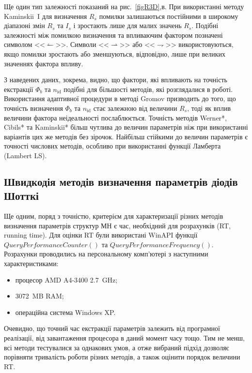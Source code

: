Ще один тип залежності показаний на рис.~\ref{figR3D},в.
При використанні методу Kaminskii~I для визначення  $R_s$ помилки залишаються постійними в широкому діапазоні змін $R_s$ та $I_s$ і зростають лише для малих значень $R_s$.
Подібні залежності між помилкою визначення та впливаючим фактором позначені символом <<$\leftharpoonup$>>.
Символи <<$\rightharpoonup$>> або <<$\rightharpoondown$>> використовуються, якщо помилки зростають або зменшуються, відповідно, лише при великих значеннях фактора впливу.

З наведених даних, зокрема, видно, що фактори, які впливають на точність екстракції $\Phi_b$ та  $n_\mathrm{id}$ подібні для більшості методів, які розглядалися в роботі.
Використання адаптивної процедури в методі Gromov призводить до того, що точність визначення $\Phi_b$ та  $n_\mathrm{id}$ стає залежною від величини $R_s$, тоді як вплив величини фактора неідеальності послаблюється.
Точність методів Werner*, Cibils* та Kaminskii* більш чутлива до величин параметрів ніж при використанні варіантів цих же методів без зірочок.
Найбільш стійкими до величин параметрів є точності числових методів, особливо при використанні функції Ламберта (Lambert LS).


\subsection{Швидкодія методів визначення параметрів діодів Шотткі}
Ще одним, поряд з точністю, критерієм для характеризації різних методів визначення параметрів структур МН є час, необхідний для розрахунків (RT, running time).
Для оцінки RT були використані WinAPI функції $QueryPerformanceCounter()$ та $QueryPerformanceFrequency()$.
Розрахунки проводились на персональному комп'ютері з наступними характеристиками:
\begin{itemize}[leftmargin=0em,itemindent=1.5em]
  \item процесор AMD A4-3400 2.7~GHz;
  \item 3072~MB RAM;
  \item операційна система Windows XP.
\end{itemize}
Очевидно, що точний час екстракції параметрів залежить від програмної реалізації, від завантаження процесора в даний момент часу тощо.
Тим не менш, всі методи тестувалися за однакових умов, а отже вибраний підхід дозволяє порівняти тривалість роботи різних методів, а також оцінити порядок величини RT.

